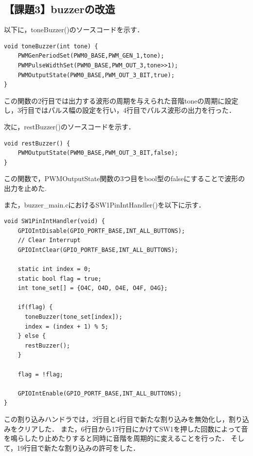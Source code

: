 \documentclass{jlreq}
\begin{document}
\subsection{【課題3】buzzerの改造}
以下に，toneBuzzer()のソースコードを示す．

\begin{lstlisting}[label=a3toneBuzzer,caption={【課題3】におけるtoneBuzzer関数}]
void toneBuzzer(int tone) {
    PWMGenPeriodSet(PWM0_BASE,PWM_GEN_1,tone);
    PWMPulseWidthSet(PWM0_BASE,PWM_OUT_3,tone>>1);
    PWMOutputState(PWM0_BASE,PWM_OUT_3_BIT,true);
}
\end{lstlisting}

この関数の2行目では出力する波形の周期を与えられた音階toneの周期に設定し，3行目ではパルス幅の設定を行い，4行目でパルス波形の出力を行った．

次に，restBuzzer()のソースコードを示す．

\begin{lstlisting}[label=a3restBuzzer,caption={【課題3】におけるrestBuzzer関数}]
void restBuzzer() {
    PWMOutputState(PWM0_BASE,PWM_OUT_3_BIT,false);
}
\end{lstlisting}

この関数で，PWMOutputState関数の3つ目をbool型のfalseにすることで波形の出力を止めた.

また，buzzer\_main.cにおけるSW1PinIntHandler()を以下に示す．

\begin{lstlisting}[label=a3SW1Int,caption={【課題3】におけるSW1PinIntHandler関数}]
void SW1PinIntHandler(void) {
    GPIOIntDisable(GPIO_PORTF_BASE,INT_ALL_BUTTONS);
    // Clear Interrupt
    GPIOIntClear(GPIO_PORTF_BASE,INT_ALL_BUTTONS);
      
    static int index = 0;
    static bool flag = true;
    int tone_set[] = {O4C, O4D, O4E, O4F, O4G};
      
    if(flag) {
      toneBuzzer(tone_set[index]);
      index = (index + 1) % 5;
    } else {
      restBuzzer();
    }
    
    flag = !flag;
  
    GPIOIntEnable(GPIO_PORTF_BASE,INT_ALL_BUTTONS);
}
\end{lstlisting}

この割り込みハンドラでは，2行目と4行目で新たな割り込みを無効化し，割り込みをクリアした．
また，6行目から17行目にかけてSW1を押した回数によって音を鳴らしたり止めたりすると同時に音階を周期的に変えることを行った．
そして，19行目で新たな割り込みの許可をした．
\end{document}
